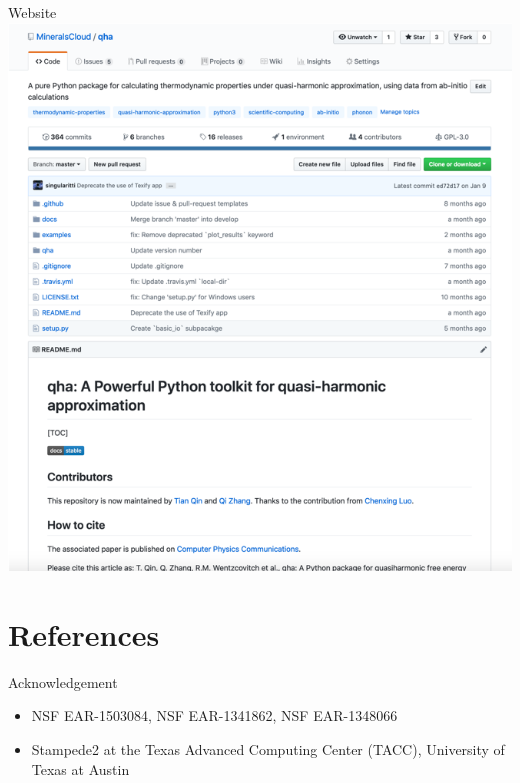 \documentclass[13pt,aspectratio=169]{beamer}
\begin{document}
\begin{frame}{Website}
	\includegraphics[height=0.8\textheight]{images/website}%
\end{frame}

\section{References}
\begin{frame}[allowframebreaks]{\secname}
	
	
\end{frame}

\begin{frame}{Acknowledgement}
	\begin{itemize}
		\item NSF EAR-1503084, NSF EAR-1341862, NSF EAR-1348066
		\item Stampede2 at the Texas Advanced Computing Center (TACC), University of Texas at Austin
	\end{itemize}
\end{frame}
\end{document}
